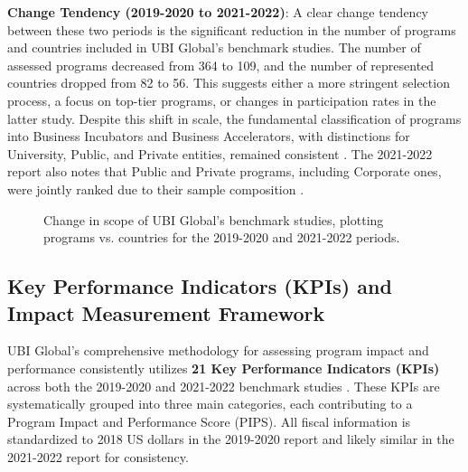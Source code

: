 \documentclass[../Main.tex]{subfiles}
\begin{document}
	\textbf{Change Tendency (2019-2020 to 2021-2022)}:
	A clear change tendency between these two periods is the significant reduction in the number of programs and countries included in UBI Global's benchmark studies. The number of assessed programs decreased from 364 to 109, and the number of represented countries dropped from 82 to 56. This suggests either a more stringent selection process, a focus on top-tier programs, or changes in participation rates in the latter study. Despite this shift in scale, the fundamental classification of programs into Business Incubators and Business Accelerators, with distinctions for University, Public, and Private entities, remained consistent \cite{ubi2019world, ubi2021world}. The 2021-2022 report also notes that Public and Private programs, including Corporate ones, were jointly ranked due to their sample composition \cite{ubi2021world}.
	
	\begin{figure}[h]
		\centering
		\caption{Change in scope of UBI Global's benchmark studies, plotting programs vs. countries for the 2019-2020 and 2021-2022 periods.}
		\label{fig:ubi_change_tendency}
	\end{figure}
	
	\subsection{Key Performance Indicators (KPIs) and Impact Measurement Framework}
	UBI Global's comprehensive methodology for assessing program impact and performance consistently utilizes \textbf{21 Key Performance Indicators (KPIs)} across both the 2019-2020 and 2021-2022 benchmark studies \cite{ubi2019world, ubi2021world}. These KPIs are systematically grouped into three main categories, each contributing to a Program Impact and Performance Score (PIPS). All fiscal information is standardized to 2018 US dollars in the 2019-2020 report and likely similar in the 2021-2022 report for consistency.
\end{document}
